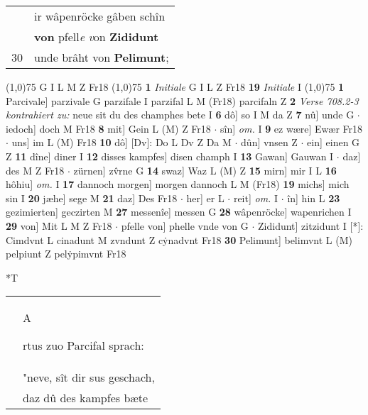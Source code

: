 \documentclass[8pt,a4paper,notitlepage]{article}
\begin{document}
\begin{table}[ht]
\begin{minipage}[t]{0.5\linewidth}
\begin{tabular}{rl}
 & ir wâpenröcke gâben schîn\\ 
 & \textbf{von} pfell\textit{e} \textit{v}on \textbf{Zididunt}\\ 
30 & unde brâht von \textbf{Pelimunt};\\ 
\end{tabular}
\scriptsize
\line(1,0){75} \newline
G I L M Z Fr18 \newline
\line(1,0){75} \newline
\textbf{1} \textit{Initiale} G I L Z Fr18  \textbf{19} \textit{Initiale} I  \newline
\line(1,0){75} \newline
\textbf{1} Parcivale] parzivale G parzifale I parzifal L M (Fr18) parcifaln Z \textbf{2} \textit{Verse 708.2-3 kontrahiert zu:} neue sit du des champhes bete I  \textbf{6} dô] so I M da Z \textbf{7} nû] unde G  $\cdot$ iedoch] doch M Fr18 \textbf{8} mit] Gein L (M) Z Fr18  $\cdot$ sîn] \textit{om.} I \textbf{9} ez wære] Ewær Fr18  $\cdot$ uns] im L (M) Fr18 \textbf{10} dô] [Dv]: Do L Dv Z Da M  $\cdot$ dûn] vnsen Z  $\cdot$ ein] einen G Z \textbf{11} dîne] diner I \textbf{12} disses kampfes] disen champh I \textbf{13} Gawan] Gauwan I  $\cdot$ daz] des M Z Fr18  $\cdot$ zürnen] zv̂rne G \textbf{14} swaz] Waz L (M) Z \textbf{15} mirn] mir I L \textbf{16} hôhiu] \textit{om.} I \textbf{17} dannoch morgen] morgen dannoch L M (Fr18) \textbf{19} michs] mich sin I \textbf{20} jæhe] sege M \textbf{21} daz] Des Fr18  $\cdot$ her] er L  $\cdot$ reit] \textit{om.} I  $\cdot$ în] hin L \textbf{23} gezimierten] geczirten M \textbf{27} messenîe] messen G \textbf{28} wâpenröcke] wapenrichen I \textbf{29} von] Mit L M Z Fr18  $\cdot$ pfelle von] phelle vnde von G  $\cdot$ Zididunt] zitzidunt I [*]: Cimdvnt L cinadunt M zvndunt Z cẏnadvnt Fr18 \textbf{30} Pelimunt] belimvnt L (M) pelpiunt Z pelẏpimvnt Fr18 \newline
\end{minipage}
\hspace{0.5cm}
\begin{minipage}[t]{0.5\linewidth}
\small
\begin{center}*T
\end{center}
\begin{tabular}{rl}
 & \begin{large}A\end{large}rtus zuo Parcifal sprach:\\ 
 & "neve, sît dir sus geschach,\\ 
 & daz dû des kampfes bæte\\ 

\end{tabular}
\end{minipage}
\end{table}
\end{document}
